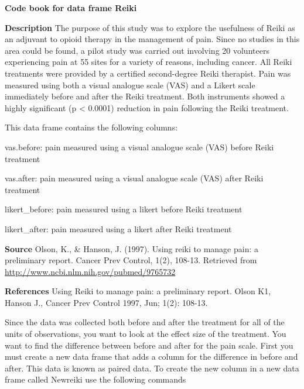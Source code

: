 \documentclass[
]{book}
\newenvironment{Shaded}{\begin{snugshade}}{\end{snugshade}}
\newcommand{\DataTypeTok}[1]{\textcolor[rgb]{0.13,0.29,0.53}{#1}}
\newcommand{\KeywordTok}[1]{\textcolor[rgb]{0.13,0.29,0.53}{\textbf{#1}}}
\newcommand{\NormalTok}[1]{#1}
\newcommand{\OperatorTok}[1]{\textcolor[rgb]{0.81,0.36,0.00}{\textbf{#1}}}
\newcommand{\StringTok}[1]{\textcolor[rgb]{0.31,0.60,0.02}{#1}}
\begin{document}
\textbf{Code book for data frame Reiki}

\textbf{Description}
The purpose of this study was to explore the usefulness of Reiki as an adjuvant to opioid therapy in the management of pain. Since no studies in this area could be found, a pilot study was carried out involving 20 volunteers experiencing pain at 55 sites for a variety of reasons, including cancer. All Reiki treatments were provided by a certified second-degree Reiki therapist. Pain was measured using both a visual analogue scale (VAS) and a Likert scale immediately before and after the Reiki treatment. Both instruments showed a highly significant (p \textless{} 0.0001) reduction in pain following the Reiki treatment.

This data frame contains the following columns:

vas.before: pain measured using a visual analogue scale (VAS) before Reiki treatment

vas.after: pain measured using a visual analogue scale (VAS) after Reiki treatment

likert\_before: pain measured using a likert before Reiki treatment

likert\_after: pain measured using a likert after Reiki treatment

\textbf{Source}
Olson, K., \& Hanson, J. (1997). Using reiki to manage pain: a preliminary report. Cancer Prev Control, 1(2), 108-13. Retrieved from \url{http://www.ncbi.nlm.nih.gov/pubmed/9765732}

\textbf{References}
Using Reiki to manage pain: a preliminary report. Olson K1, Hanson J., Cancer Prev Control 1997, Jun; 1(2): 108-13.

Since the data was collected both before and after the treatment for all of the units of observations, you want to look at the effect size of the treatment. You want to find the difference between before and after for the pain scale. First you must create a new data frame that adds a column for the difference in before and after. This data is known as paired data. To create the new column in a new data frame called Newreiki use the following commands

\begin{Shaded}
\end{Shaded}
\end{document}
